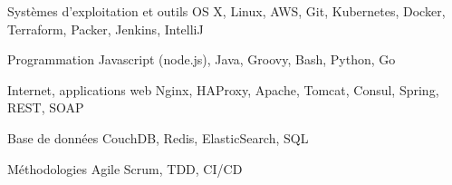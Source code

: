 
\begin{cvskills}

  \cvskill
    {Systèmes d'exploitation et outils} %
    {OS X, Linux, AWS, Git, Kubernetes, Docker, Terraform, Packer, Jenkins, IntelliJ} %

  \cvskill
    {Programmation} %
    {Javascript (node.js), Java, Groovy, Bash, Python, Go} %

  \cvskill
    {Internet, applications web} %
    {Nginx, HAProxy, Apache, Tomcat, Consul, Spring, REST, SOAP} %

  \cvskill
    {Base de données} %
    {CouchDB, Redis, ElasticSearch, SQL} %

  \cvskill
    {Méthodologies} %
    {Agile Scrum, TDD, CI/CD} %

\end{cvskills}